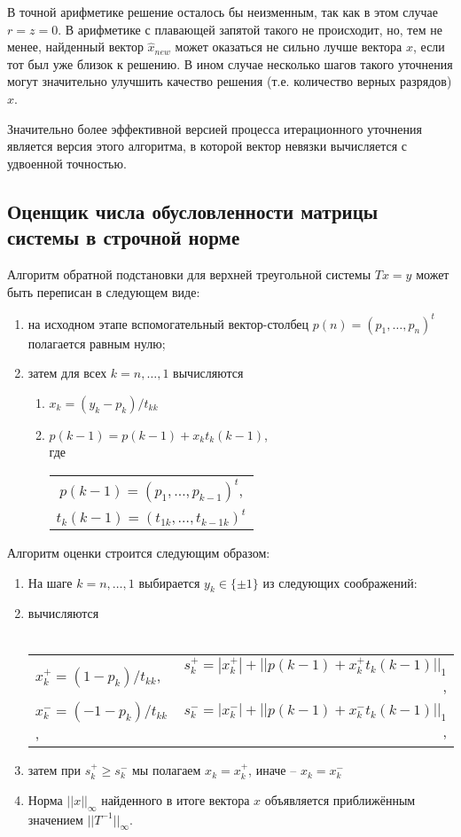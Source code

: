 В точной арифметике решение осталось бы неизменным, так как в этом случае $r = z = 0$. В арифметике с плавающей запятой такого не происходит, но, тем не менее, найденный вектор $\hat{x}_{new}$ может оказаться не сильно лучше вектора $\hat{x}$, если тот был уже близок к решению. В ином случае несколько шагов такого уточнения могут значительно улучшить качество решения (т.е. количество верных разрядов) $\hat{x}$.

Значительно более эффективной версией процесса итерационного уточнения является версия этого алгоритма, в которой вектор невязки вычисляется с удвоенной точностью. 


\subsection{Оценщик числа обусловленности матрицы системы в строчной норме}

Алгоритм обратной подстановки для верхней треугольной системы $Tx=y$ может быть переписан в следующем виде:
\begin{enumerate}
	\item на исходном этапе вспомогательный вектор-столбец $p(n)=(p_1, \dots, p_n)^t$ полагается равным нулю;
	\item затем для всех $k=n, \dots, 1$ вычисляются
	\begin{enumerate}
		\item $x_k =(y_k - p_k) / t_{kk}$ 
		\item $p(k-1) = p(k-1) + x_{k}t_{k}(k-1)$, \\ где 
			\begin{tabular}{c}
		 		$p(k-1)=(p_1, \dots, p_{k-1})^t$, \\
		 		$t_k(k-1)=(t_{1k}, \dots, t_{k-1k})^t$ \\
			\end{tabular}
		\end{enumerate}
\end{enumerate}

Алгоритм оценки строится следующим образом:
\begin{enumerate}
	\item На шаге $ k = n, \dots, 1$ выбирается $y_k \in \{\pm1\}$ из следующих соображений:
	\item вычисляются \\ \\
		\begin{tabular}{l r}
			$x^{+}_{k} = (1-p_k)/t_{kk}$, &	
			$s^{+}_{k} = |x^{+}_{k}| + || p(k-1) + x^{+}_{k}t_{k}(k-1) ||_1$, \\
			
			$x^{-}_{k} = (-1-p_k)/t_{kk}$, &	
			$s^{-}_{k} = |x^{-}_{k}| + || p(k-1) + x^{-}_{k}t_{k}(k-1) ||_1$, \\
		\end{tabular}
	\item затем при $s^{+}_{k} \geq s^{-}_{k}$ мы полагаем $x_{k} = x_{k}^{+}$, иначе – $x_{k} = x^{-}_{k}$
	\item Норма $||x||_{ \infty }$ найденного в итоге вектора $x$ объявляется приближённым значением $||T^{-1}||_{ \infty }$.
\end{enumerate}

